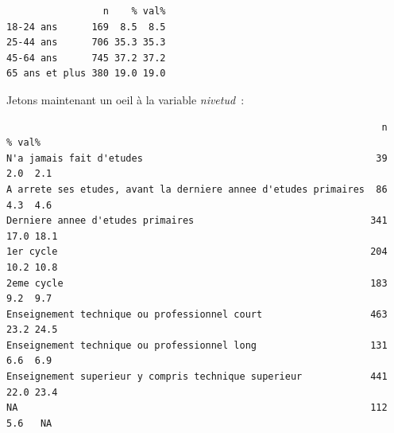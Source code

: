 \documentclass[
  letterpaper,
  DIV=11,
  numbers=noendperiod,
  oneside]{scrreprt}
\newenvironment{Shaded}{\begin{snugshade}}{\end{snugshade}}
\newcommand{\AttributeTok}[1]{\textcolor[rgb]{0.40,0.45,0.13}{#1}}
\newcommand{\ConstantTok}[1]{\textcolor[rgb]{0.56,0.35,0.01}{#1}}
\newcommand{\DecValTok}[1]{\textcolor[rgb]{0.68,0.00,0.00}{#1}}
\newcommand{\FunctionTok}[1]{\textcolor[rgb]{0.28,0.35,0.67}{#1}}
\newcommand{\NormalTok}[1]{\textcolor[rgb]{0.00,0.23,0.31}{#1}}
\newcommand{\OtherTok}[1]{\textcolor[rgb]{0.00,0.23,0.31}{#1}}
\newcommand{\SpecialCharTok}[1]{\textcolor[rgb]{0.37,0.37,0.37}{#1}}
\newcommand{\StringTok}[1]{\textcolor[rgb]{0.13,0.47,0.30}{#1}}
\begin{document}
\begin{Shaded}
\end{Shaded}

\begin{verbatim}
                 n    % val%
18-24 ans      169  8.5  8.5
25-44 ans      706 35.3 35.3
45-64 ans      745 37.2 37.2
65 ans et plus 380 19.0 19.0
\end{verbatim}

Jetons maintenant un oeil à la variable \emph{nivetud}~:

\begin{Shaded}
\end{Shaded}

\begin{verbatim}
                                                                  n    % val%
N'a jamais fait d'etudes                                         39  2.0  2.1
A arrete ses etudes, avant la derniere annee d'etudes primaires  86  4.3  4.6
Derniere annee d'etudes primaires                               341 17.0 18.1
1er cycle                                                       204 10.2 10.8
2eme cycle                                                      183  9.2  9.7
Enseignement technique ou professionnel court                   463 23.2 24.5
Enseignement technique ou professionnel long                    131  6.6  6.9
Enseignement superieur y compris technique superieur            441 22.0 23.4
NA                                                              112  5.6   NA
\end{verbatim}
\end{document}
